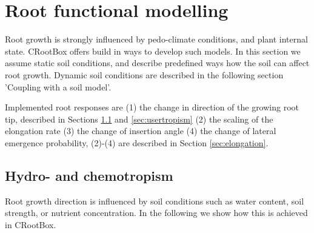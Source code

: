 \documentclass[a4paper]{article}
\begin{document}
\section{Root functional modelling}

Root growth is strongly influenced by pedo-climate conditions, and plant internal state. CRootBox offers build in ways to develop such models. 
In this section we assume static soil conditions, and describe predefined ways how the soil can affect root growth.
Dynamic soil conditions are described in the following section 'Coupling with a soil model'. 

Implemented root responses are (1) the change in direction of the growing root tip, described in Sections \ref{sec:hydro} and \ref{sec:usertropism} 
(2) the scaling of the elongation rate (3) the change of insertion angle (4) the change of lateral emergence probability, (2)-(4) are described in Section \ref{sec:elongation}.

\subsection{Hydro- and chemotropism} \label{sec:hydro}

Root growth direction is influenced by soil conditions such as water content, soil strength, or nutrient concentration. 
In the following we show how this is achieved in CRootBox.


\end{document}
